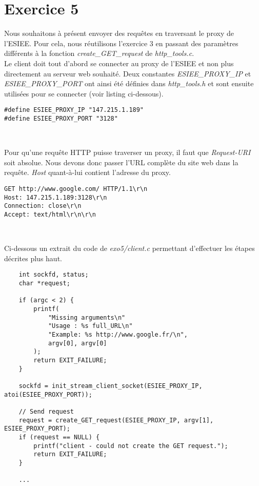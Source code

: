 \documentclass[a4paper, frenchb, 11pt]{article}
\begin{document}
\newpage

\section{Exercice 5}
Nous souhaitons à présent envoyer des requêtes en traversant le proxy de l'ESIEE. Pour cela, nous réutilisons l'exercice 3 en passant des paramètres différents à la fonction \emph{create\_GET\_request} de \emph{http\_tools.c}.\\

Le client doit tout d'abord se connecter au proxy de l'ESIEE et non plus directement au serveur web souhaité. Deux constantes \emph{ESIEE\_PROXY\_IP} et \emph{ESIEE\_PROXY\_PORT} ont ainsi été définies dans \emph{http\_tools.h} et sont ensuite utilisées pour se connecter (voir listing ci-dessous).

\begin{lstlisting}[caption=Extrait de http\_tools.h]
#define ESIEE_PROXY_IP "147.215.1.189"
#define ESIEE_PROXY_PORT "3128"
\end{lstlisting}
\

Pour qu'une requête HTTP puisse traverser un proxy, il faut que \emph{Request-URI} soit absolue. Nous devons donc passer l'URL complète du site web dans la requête. \emph{Host} quant-à-lui contient l'adresse du proxy.

\begin{lstlisting}[caption=Exemple de requête en passant par le proxy de l'ESIEE]
GET http://www.google.com/ HTTP/1.1\r\n
Host: 147.215.1.189:3128\r\n
Connection: close\r\n
Accept: text/html\r\n\r\n
\end{lstlisting}
\

\noindent Ci-dessous un extrait du code de \emph{exo5/client.c} permettant d'effectuer les étapes décrites plus haut.

\begin{lstlisting}
    int sockfd, status;
    char *request;

    if (argc < 2) {
        printf(
            "Missing arguments\n"
            "Usage : %s full_URL\n"
            "Example: %s http://www.google.fr/\n",
            argv[0], argv[0]
        );
        return EXIT_FAILURE;
    }

    sockfd = init_stream_client_socket(ESIEE_PROXY_IP, atoi(ESIEE_PROXY_PORT));

    // Send request
    request = create_GET_request(ESIEE_PROXY_IP, argv[1], ESIEE_PROXY_PORT);
    if (request == NULL) {
        printf("client - could not create the GET request.");
        return EXIT_FAILURE;
    }

    ...
\end{lstlisting}
\end{document}
